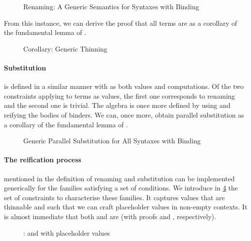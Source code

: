 \begin{figure}[h]
\caption{Renaming: A Generic Semantics for Syntaxes with Binding\label{fig:genrensem}}
\end{figure}

From this instance, we can derive the proof that all terms are  as
a corollary of the fundamental lemma of .

\begin{figure}[h]
\caption{Corollary: Generic Thinning\label{fig:genren}}
\end{figure}

\paragraph{Substitution} is defined in a similar manner with 
as both values and computations. Of the two constraints applying to
terms as values, the first one corresponds to renaming and the second
one is trivial. The algebra is once more defined by using  and
reifying the bodies of binders. We can, once more, obtain parallel
substitution as a corollary of the fundamental lemma of .

\begin{figure}[h]
\caption{Generic Parallel Substitution for All Syntaxes with Binding\label{fig:gensub}}
\end{figure}

\paragraph{The reification process} mentioned in the definition of renaming
and substitution can be implemented generically for the \semrec{} families
satisfying a set of conditions.
%
We introduce in \cref{fig:VarLike} the  set of constraints
to characterise these families. It captures values that are thinnable and
such that we can craft placeholder values in non-empty contexts. It is
almost immediate that both  and  are  (with
proofs  and ,
respectively).

\begin{figure}[h]
\caption{:  and with placeholder values\label{fig:VarLike}}
\end{figure}

